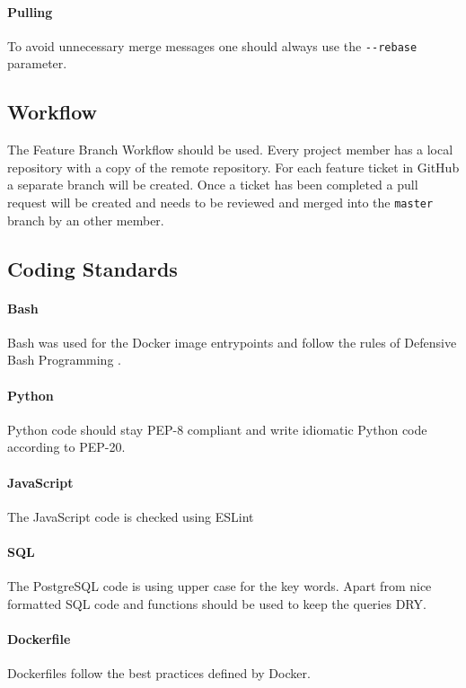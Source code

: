 \paragraph{Pulling}
To avoid unnecessary merge messages one should always use the
\texttt{-\/-rebase} parameter.

\subsection{Workflow}\label{git-workflow}
The Feature Branch Workflow\cite{pm_9_atlassian_git_tutorial_2015} should be used. Every project member has a local repository with a copy of the remote
repository. For each feature ticket in GitHub a separate branch
will be created. Once a ticket has been completed a pull request will be
created and needs to be reviewed and merged into the \texttt{master} branch by an other member.

\subsection*{Coding Standards}

\paragraph{Bash} Bash was used for the Docker image entrypoints and follow
the rules of Defensive Bash Programming \cite{pm_10_lavi_2012}.

\paragraph{Python} Python code should stay PEP-8\cite{pm_11_python.org_2015} compliant and write idiomatic Python code according to PEP-20\cite{pm_12_python.org_2015}.

\paragraph{JavaScript} The JavaScript code is checked using ESLint\cite{pm_13_eslint.org_2015}

\paragraph{SQL} The PostgreSQL code is using upper case for the key words. Apart from nice formatted SQL code and functions should be used
to keep the queries DRY\cite{pm_14_wikipedia_2015}.

\paragraph{Dockerfile} Dockerfiles follow the best practices\cite{pm_15_docs.docker.com_2015} defined by Docker.
